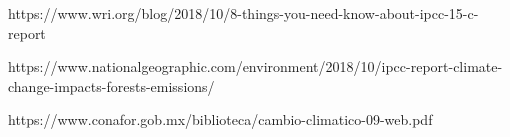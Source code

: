 \documentclass[12pt,a4paper]{article}
\begin{document}
\begin{thebibliography}{0}

 https://www.wri.org/blog/2018/10/8-things-you-need-know-about-ipcc-15-c-report

 https://www.nationalgeographic.com/environment/2018/10/ipcc-report-climate-change-impacts-forests-emissions/

 https://www.conafor.gob.mx/biblioteca/cambio-climatico-09-web.pdf


\end{thebibliography}
\end{document}
